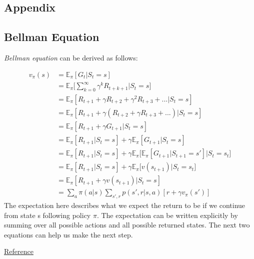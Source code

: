 \renewcommand{\thesection}{\Alph{section}.\arabic{section}}
\setcounter{section}{0}

\begin{appendices}
\chapter{Appendix}

\section{Bellman Equation}

\textit{Bellman equation} can be derived as follows:

\begin{align*}
	v_\pi(s) &= \mathbb{E}_\pi[G_t|S_t=s]\\
	& = \mathbb{E}_\pi\Bigg[\sum_{k=0}^{\infty}\gamma^k R_{t+k+1}\Big|S_t=s\Bigg]\\
	& = \mathbb{E}_\pi[R_{t+1} + \gamma R_{t+2} + \gamma^2 R_{t+3} + ...|S_t=s]\\
	& = \mathbb{E}_\pi[R_{t+1} + \gamma (R_{t+2} + \gamma R_{t+3} + ...)|S_t=s]\\
	& = \mathbb{E}_\pi[R_{t+1} + \gamma G_{t+1}|S_t=s]\\
	& = \mathbb{E}_\pi[R_{t+1}|S_t=s] + \gamma \mathbb{E}_\pi[ G_{t+1}|S_t=s]\\
	& = \mathbb{E}_\pi[R_{t+1}|S_t=s] + \gamma \mathbb{E}_\pi\Big[\mathbb{E}_\pi[ G_{t+1}|S_{t+1}=s']\Big|S_t = s_t\Big] \\
	& = \mathbb{E}_\pi[R_{t+1}|S_t=s] + \gamma \mathbb{E}_\pi\Big[v(s_{t+1})\Big|S_t = s_t\Big]\\
	& = \mathbb{E}_\pi[R_{t+1} + \gamma v(s_{t+1})|S_t=s]\\
	& = \sum_{a}\pi(a|s)\sum_{s',r}p(s',r|s,a)[r + \gamma v_\pi(s')]
\end{align*}
The expectation here describes what we expect the return to be if we continue from state s following policy $\pi$. The expectation can be written explicitly by summing over all possible actions and all possible returned states. The next two equations can help us make the next step.

\href{https://stats.stackexchange.com/questions/243384/deriving-bellmans-equation-in-reinforcement-learning}{Reference}

\end{appendices}
